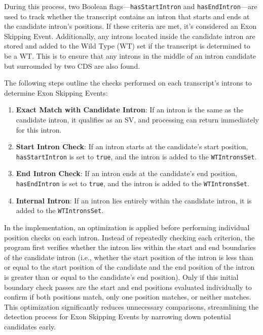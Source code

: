 \documentclass{article}
\begin{document}
    During this process, two Boolean flags—\texttt{hasStartIntron} and \texttt{hasEndIntron}—are used to track whether the transcript contains an intron that starts and ends at the candidate intron’s positions. If these criteria are met, it’s considered an Exon Skipping Event. Additionally, any introns located inside the candidate intron are stored and added to the Wild Type (WT) set if the transcript is determined to be a WT. This is to ensure that any introns in the middle of an intron candidate but surrounded by two CDS are also found.

    The following steps outline the checks performed on each transcript’s introns to determine Exon Skipping Events:

    \begin{enumerate}
        \item \textbf{Exact Match with Candidate Intron}: If an intron is the same as the candidate intron, it qualifies as an SV, and processing can return immediately for this intron.
        \item \textbf{Start Intron Check}: If an intron starts at the candidate’s start position, \texttt{hasStartIntron} is set to \texttt{true}, and the intron is added to the \texttt{WTIntronsSet}.
        \item \textbf{End Intron Check}: If an intron ends at the candidate’s end position, \texttt{hasEndIntron} is set to \texttt{true}, and the intron is added to the \texttt{WTIntronsSet}.
        \item \textbf{Internal Intron}: If an intron lies entirely within the candidate intron, it is added to the \texttt{WTIntronsSet}.
    \end{enumerate}
    In the implementation, an optimization is applied before performing individual position checks on each intron. Instead of repeatedly checking each criterion, the program first verifies whether the intron lies within the start and end boundaries of the candidate intron (i.e., whether the start position of the intron is less than or equal to the start position of the candidate and the end position of the intron is greater than or equal to the candidate’s end position). Only if this initial boundary check passes are the start and end positions evaluated individually to confirm if both positions match, only one position matches, or neither matches. This optimization significantly reduces unnecessary comparisons, streamlining the detection process for Exon Skipping Events by narrowing down potential candidates early.
\end{document}
